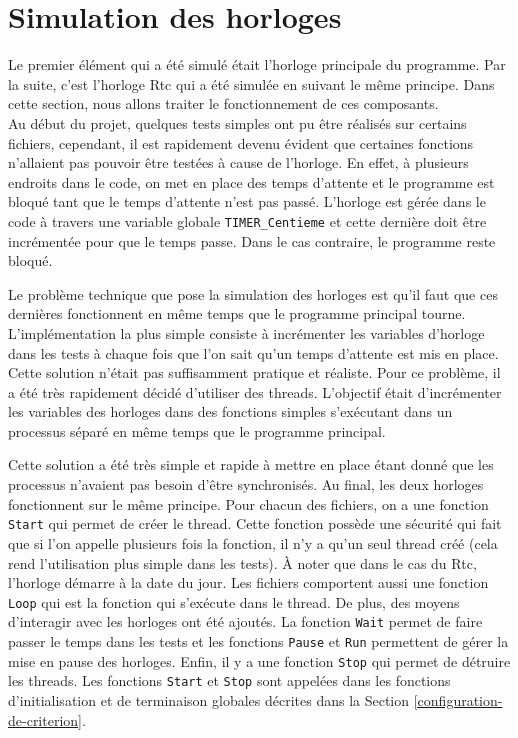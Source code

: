 \documentclass[a4paper]{article}
\begin{document}
\section{Simulation des horloges}%
\label{simuhorologes}

Le premier élément qui a été simulé était l'horloge principale du programme. Par
la suite, c'est l'horloge Rtc qui a été simulée en suivant le même principe.
Dans cette section, nous allons traiter le fonctionnement de ces composants.\\

Au début du projet, quelques tests simples ont pu être réalisés sur certains
fichiers, cependant, il est rapidement devenu évident que certaines fonctions
n'allaient pas pouvoir être testées à cause de l'horloge. En effet, à plusieurs
endroits dans le code, on met en place des temps d'attente et le programme est
bloqué tant que le temps d'attente n'est pas passé. L'horloge est gérée dans le
code à travers une variable globale \verb|TIMER_Centieme| et cette dernière doit
être incrémentée pour que le temps passe. Dans le cas contraire, le programme
reste bloqué.

Le problème technique que pose la simulation des horloges est qu'il faut que ces
dernières fonctionnent en même temps que le programme principal tourne.
L'implémentation la plus simple consiste à incrémenter les variables d'horloge
dans les tests à chaque fois que l'on sait qu'un temps d'attente est mis en
place. Cette solution n'était pas suffisamment pratique et réaliste. Pour ce
problème, il a été très rapidement décidé d'utiliser des threads. L'objectif
était d'incrémenter les variables des horloges dans des fonctions simples
s'exécutant dans un processus séparé en même temps que le programme principal.

Cette solution a été très simple et rapide à mettre en place étant donné que les
processus n'avaient pas besoin d'être synchronisés. Au final, les deux horloges
fonctionnent sur le même principe. Pour chacun des fichiers, on a une fonction
\verb|Start| qui permet de créer le thread. Cette fonction possède une sécurité
qui fait que si l'on appelle plusieurs fois la fonction, il n'y a qu'un seul
thread créé (cela rend l'utilisation plus simple dans les tests). À noter que
dans le cas du Rtc, l'horloge démarre à la date du jour. Les fichiers comportent
aussi une fonction \verb|Loop| qui est la fonction qui s'exécute dans le thread.
De plus, des moyens d'interagir avec les horloges ont été ajoutés. La fonction
\verb|Wait| permet de faire passer le temps dans les tests et les fonctions
\verb|Pause| et \verb|Run| permettent de gérer la mise en pause des horloges.
Enfin, il y a une fonction \verb|Stop| qui permet de détruire les threads. Les
fonctions \verb|Start| et \verb|Stop| sont appelées dans les fonctions
d'initialisation et de terminaison globales décrites dans la Section
\ref{configuration-de-criterion}.\\
\end{document}
